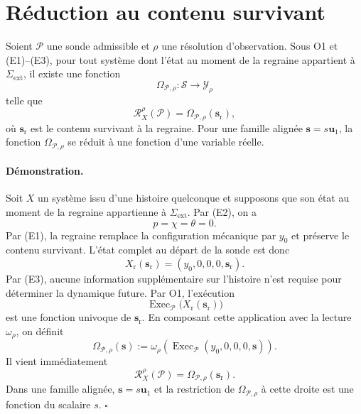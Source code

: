 \section{Réduction au contenu survivant}
\label{annexe-H-theoreme}

\begin{encadre}[title={Théorème \theproposition{} --- Réduction au contenu survivant}]
Soient $\mathcal P$ une sonde admissible et $\rho$ une résolution
d'observation. Sous O1 et (E1)--(E3), pour tout système dont l'état au moment
de la regraine appartient à $\Sigma_{\mathrm{ext}}$, il existe une
fonction
\[
\Omega_{\mathcal P,\rho}:\mathcal S\longrightarrow\mathcal Y_\rho
\]
telle que
\begin{equation}
\label{eq:annexe-H-theoreme-reduction}
\boxed{
\mathcal R_X^{\rho}(\mathcal P)
=
\Omega_{\mathcal P,\rho}(\mathbf s_{\mathrm r}),
}
\end{equation}
où $\mathbf s_{\mathrm r}$ est le contenu survivant à la regraine.
Pour une famille alignée $\mathbf s=s\mathbf u_1$, la fonction
$\Omega_{\mathcal P,\rho}$ se réduit à une fonction d'une variable
réelle.
\end{encadre}

\paragraph{Démonstration.}
Soit $X$ un système issu d'une histoire quelconque et supposons que son
état au moment de la regraine appartienne à
$\Sigma_{\mathrm{ext}}$. Par (E2), on a
\[
p=\chi=\theta=0.
\]
Par (E1), la regraine remplace la configuration mécanique par $y_0$ et
préserve le contenu survivant. L'état complet au départ de la sonde est
donc
\[
X_{\mathrm r}(\mathbf s_{\mathrm r})
=
(y_0,0,0,0,\mathbf s_{\mathrm r}).
\]
Par (E3), aucune information supplémentaire sur l'histoire n'est requise
pour déterminer la dynamique future. Par O1, l'exécution
\[
\operatorname{Exec}_{\mathcal P}
\bigl(X_{\mathrm r}(\mathbf s_{\mathrm r})\bigr)
\]
est une fonction univoque de $\mathbf s_{\mathrm r}$. En composant cette
application avec la lecture $\omega_\rho$, on définit
\begin{equation}
\label{eq:annexe-H-definition-omega}
\Omega_{\mathcal P,\rho}(\mathbf s)
:=
\omega_\rho\!\left(
\operatorname{Exec}_{\mathcal P}
(y_0,0,0,0,\mathbf s)
\right).
\end{equation}
Il vient immédiatement
\[
\mathcal R_X^{\rho}(\mathcal P)
=
\Omega_{\mathcal P,\rho}(\mathbf s_{\mathrm r}).
\]
Dans une famille alignée, $\mathbf s=s\mathbf u_1$ et la restriction de
$\Omega_{\mathcal P,\rho}$ à cette droite est une fonction du scalaire
$s$. \hfill$\square$

